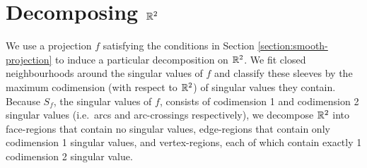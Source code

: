 \section{Decomposing $\mathbb{R}^2$}

We use a projection $f$ satisfying the conditions in Section \ref{section:smooth-projection} to induce a particular decomposition on $\mathbb{R}^2$.
We fit closed neighbourhoods around the singular values of $f$ and classify these sleeves by the maximum codimension (with respect to $\mathbb{R}^2$) of singular values they contain.
Because $S_f$, the singular values of $f$, consists of codimension 1 and codimension 2 singular values (i.e.\ arcs and arc-crossings respectively), we decompose $\mathbb{R}^2$ into face-regions that contain no singular values, edge-regions that contain only codimension 1 singular values, and vertex-regions, each of which contain exactly 1 codimension 2 singular value.